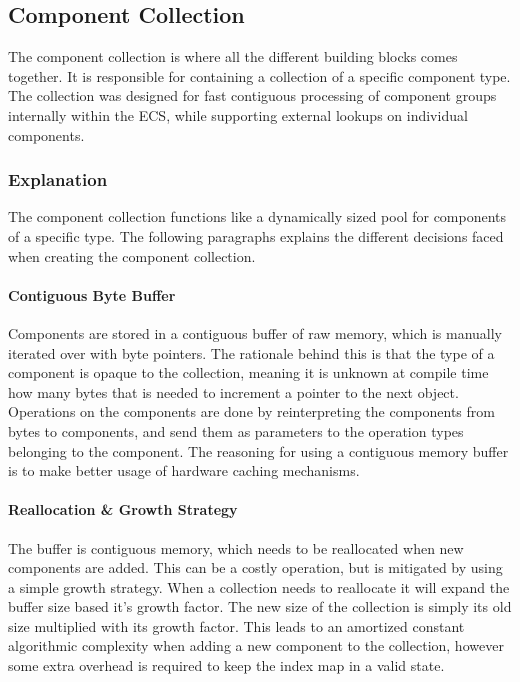 \subsection{Component Collection}
\label{subsec:detailed_component_collection}
The component collection is where all the different building blocks comes together.
It is responsible for containing a collection of a specific component type.
The collection was designed for fast contiguous processing of component groups internally within the ECS,
while supporting external lookups on individual components.

\subsubsection{Explanation}
The component collection functions like a dynamically sized pool for components of a specific type.
The following paragraphs explains the different decisions faced when creating the component collection.

\paragraph{Contiguous Byte Buffer}
Components are stored in a contiguous buffer of raw memory,
which is manually iterated over with byte pointers.
The rationale behind this is that the type of a component is opaque
to the collection, meaning it is unknown at compile time
how many bytes that is needed to increment a pointer to the next object.
Operations on the components are done by reinterpreting the components from bytes to components,
and send them as parameters to the operation types belonging to the component.
The reasoning for using a contiguous memory buffer is to make better usage of hardware caching mechanisms.

\paragraph{Reallocation \& Growth Strategy}
\label{par:detailed_component_collection_reallocation_growth}
The buffer is contiguous memory, which needs to be reallocated when new components are added.
This can be a costly operation, but is mitigated by using a simple growth strategy.
When a collection needs to reallocate it will expand the buffer size based it's growth factor.
The new size of the collection is simply its old size multiplied with its growth factor.
This leads to an amortized constant algorithmic complexity when adding a new component to the collection,
however some extra overhead is required to keep the index map in a valid state.

